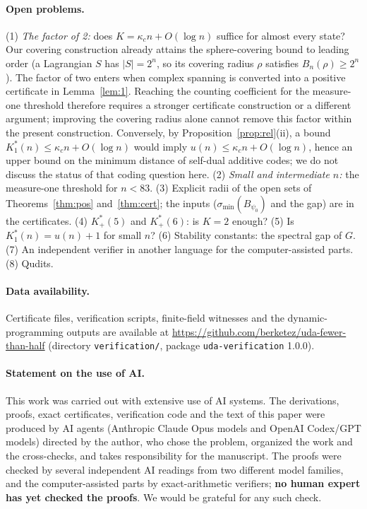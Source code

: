 \documentclass[aps,pra,onecolumn,superscriptaddress,nofootinbib,longbibliography,10pt]{revtex4-2}
\theoremstyle{definition}
\newcommand{\kc}{\kappa_c}
\newcommand{\Kp}{K^{*}_{+}}
\newcommand{\Ko}{K^{*}_{1}}
\begin{document}
\paragraph*{Open problems.}
(1) \emph{The factor of 2:} does $K=\kc n+O(\log n)$ suffice for almost every state? Our covering construction already attains the sphere-covering bound to leading order (a Lagrangian $S$ has $|S|=2^n$, so its covering radius $\rho$ satisfies $B_n(\rho)\ge2^n$). The factor of two enters when complex spanning is converted into a positive certificate in Lemma~\ref{lem:1}. Reaching the counting coefficient for the measure-one threshold therefore requires a stronger certificate construction or a different argument; improving the covering radius alone cannot remove this factor within the present construction. Conversely, by Proposition~\ref{prop:rel}(ii), a bound $\Ko(n)\le\kc n+O(\log n)$ would imply $u(n)\le\kc n+O(\log n)$, hence an upper bound on the minimum distance of self-dual additive codes; we do not discuss the status of that coding question here.
(2) \emph{Small and intermediate $n$:} the measure-one threshold for $n<83$.
(3) Explicit radii of the open sets of Theorems~\ref{thm:pos} and~\ref{thm:cert}; the inputs ($\sigma_{\min}(B_{\psi_0})$ and the gap) are in the certificates.
(4) $\Kp(5)$ and $\Kp(6)$: is $K=2$ enough?
(5) Is $\Ko(n)=u(n)+1$ for small $n$?
(6) Stability constants: the spectral gap of $G$.
(7) An independent verifier in another language for the computer-assisted parts.
(8) Qudits.

\paragraph*{Data availability.} Certificate files, verification scripts, finite-field witnesses and the dynamic-programming outputs are available at \url{https://github.com/berketez/uda-fewer-than-half} (directory \texttt{verification/}, package \texttt{uda-verification} 1.0.0).

\paragraph*{Statement on the use of AI.} This work was carried out with extensive use of AI systems. The derivations, proofs, exact certificates, verification code and the text of this paper were produced by AI agents (Anthropic Claude Opus models and OpenAI Codex/GPT models) directed by the author, who chose the problem, organized the work and the cross-checks, and takes responsibility for the manuscript. The proofs were checked by several independent AI readings from two different model families, and the computer-assisted parts by exact-arithmetic verifiers; \textbf{no human expert has yet checked the proofs}. We would be grateful for any such check.
\end{document}
